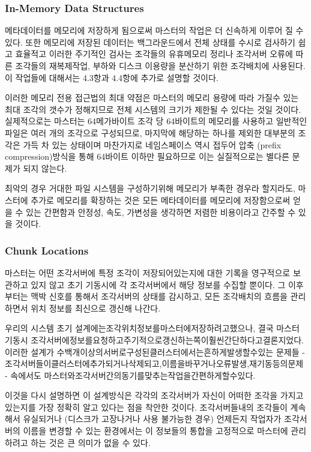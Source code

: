 \documentclass[twocolumn]{article}
\begin{document}
\subsubsection{In-Memory Data Structures}

  메타데이터를 메모리에 저장하게 됨으로써 마스터의 작업은 더 신속하게 이루어 질 수 있다.  또한 메모리에 저장된 데이터는 백그라운드에서 전체 상태를 수시로 검사하기 쉽고 효율적고 이러한 주기적인 검사는 조각들의 유휴메모리 정리나 조각서버 오류에 따른 조각들의 재복제작업, 부하와 디스크 이용량을 분산하기 위한 조각배치에 사용된다.  이 작업들에 대해서는 4.3항과 4.4항에 추가로 설명할 것이다.

 이러한 메모리 전용 접근법의 최대 약점은 마스터의 메모리 용량에 따라 가질수 있는 최대 조각의 갯수가 정해지므로 전체 시스템의 크기가 제한될 수 있다는 것일 것이다.  실제적으로는 마스터는 64메가바이트 조각 당 64바이트의 메모리를 사용하고 일반적인 파일은 여러 개의 조각으로 구성되므로, 마지막에 해당하는 하나를 제외한 대부분의 조각은 가득 차 있는 상태이며 마찬가지로 네임스페이스 역시 접두어 압축 (prefix compression)방식을 통해 64바이트 이하만 필요하므로 이는 실질적으로는 별다른 문제가 되지 않는다.

최악의 경우 거대한 파일 시스템을 구성하기위해 메모리가 부족한 경우라 할지라도, 마스터에 추가로 메모리를 확장하는 것은 모든 메타데이터를 메모리에 저장함으로써 얻을 수 있는 간편함과 안정성, 속도, 가변성을 생각하면 저렴한 비용이라고 간주할 수 있을 것이다.

\subsubsection{Chunk Locations}

 마스터는 어떤 조각서버에 특정 조각이 저장되어있는지에 대한 기록을 영구적으로 보관하고 있지 않고 초기 기동시에 각 조각서버에서 해당 정보를 수집할 뿐이다. 그 이후부터는 맥박 신호를 통해서 조각서버의 상태를 감시하고, 모든 조각배치의 흐름을 관리하면서 위치 정보를 최신으로 갱신해 나간다.

 우리의 시스템 초기 설계에는조각위치정보를마스터에저장하려고했으나, 결국 마스터 기동시 조각서버에정보를요청하고주기적으로갱신하는쪽이훨씬간단하다고결론지었다. 이러한 설계가 수백개이상의서버로구성된클러스터에서는흔하게발생할수있는 문제들 - 조각서버들이클러스터에추가되거나삭제되고,이름을바꾸거나오류발생,재기동등의문제 - 속에서도 마스터와조각서버간의동기를맞추는작업을간편하게할수있다.

 이것을 다시 설명하면 이 설계방식은 각각의 조각서버가 자신이 어떠한 조각을 가지고 있는지를 가장 정확히 알고 있다는 점을 착안한 것이다.  조각서버들내의 조각들이 계속해서 유실되거나 (디스크가 고장나거나 사용 불가능한 경우) 언제든지 작업자가 조각서버의 이름을 변경할 수 있는 환경에서는 이 정보들의 통합을 고정적으로 마스터에 관리하려고 하는 것은 큰 의미가 없을 수 있다.
\end{document}
